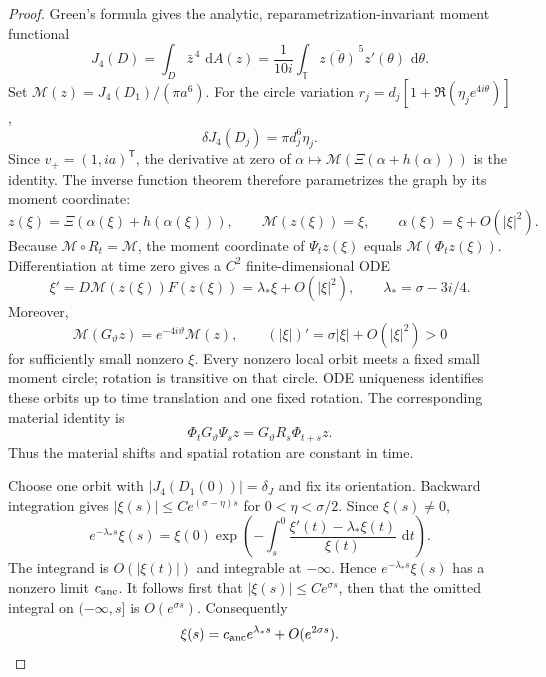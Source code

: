 \documentclass[11pt]{amsart}
\theoremstyle{remark}
\numberwithin{equation}{section}
\newcommand{\T}{\mathbb T}
\newcommand{\dd}{\,\mathrm d}
\begin{document}
\begin{proof}
Green's formula gives the analytic, reparametrization-invariant
moment functional
\begin{equation}\label{pc:moment-functional}
 J_4(D)=\int_D\bar z^{\,4}\,\dd A(z)
       =\frac1{10i}\int_\T\overline{z(\theta)}^{\,5}z'(\theta)\,\dd\theta.
\end{equation}
Set $\mathcal M(z)=J_4(D_1)/(\pi a^6)$. For the circle variation
$r_j=d_j[1+\Re(\eta_je^{4i\theta})]$,
\[
 \delta J_4(D_j)=\pi d_j^6\eta_j.
\]
Since $v_+=(1,ia)^{\mathsf T}$, the derivative at zero of
$\alpha\mapsto\mathcal M(\Xi(\alpha+h(\alpha)))$ is the identity.
The inverse function theorem therefore parametrizes the graph by
its moment coordinate:
\[
 z(\xi)=\Xi(\alpha(\xi)+h(\alpha(\xi))),\qquad
 \mathcal M(z(\xi))=\xi,\qquad\alpha(\xi)=\xi+O(|\xi|^2).
\]
Because $\mathcal M\circ R_t=\mathcal M$, the moment coordinate
of $\Psi_tz(\xi)$ equals $\mathcal M(\Phi_tz(\xi))$.
Differentiation at time zero gives a $C^2$ finite-dimensional ODE
\[
 \xi'=D\mathcal M(z(\xi))F(z(\xi))
       =\lambda_*\xi+O(|\xi|^2),\qquad\lambda_*=\sigma-3i/4.
\]
Moreover,
\[
 \mathcal M(G_\vartheta z)=e^{-4i\vartheta}\mathcal M(z),\qquad
 (|\xi|)'=\sigma|\xi|+O(|\xi|^2)>0
\]
for sufficiently small nonzero $\xi$. Every nonzero local orbit
meets a fixed small moment circle; rotation is transitive on
that circle. ODE uniqueness identifies these orbits up to time
translation and one fixed rotation. The corresponding material
identity is
\begin{equation}\label{pc:material-identification}
 \Phi_tG_\vartheta\Psi_sz=G_\vartheta R_s\Phi_{t+s}z.
\end{equation}
Thus the material shifts and spatial rotation are constant in time.

Choose one orbit with $|J_4(D_1(0))|=\delta_J$ and fix its
orientation. Backward integration gives
$|\xi(s)|\le Ce^{(\sigma-\eta)s}$ for $0<\eta<\sigma/2$.
Since $\xi(s)\ne0$,
\[
 e^{-\lambda_*s}\xi(s)=\xi(0)
 \exp\left(-\int_s^0
       \frac{\xi'(t)-\lambda_*\xi(t)}{\xi(t)}\,\dd t\right).
\]
The integrand is $O(|\xi(t)|)$ and integrable at $-\infty$.
Hence $e^{-\lambda_*s}\xi(s)$ has a nonzero limit
$c_{\rm anc}$. It follows first that $|\xi(s)|\le Ce^{\sigma s}$,
then that the omitted integral on $(-\infty,s]$ is $O(e^{\sigma s})$.
Consequently
\[
 \xi(s)=c_{\rm anc}e^{\lambda_*s}+O(e^{2\sigma s}).
\]


\end{proof}
\end{document}
